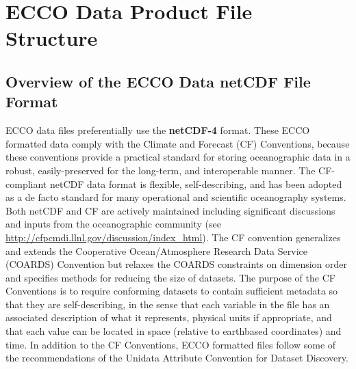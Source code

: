 



\pagebreak

\section{ECCO Data Product File Structure}
\subsection{Overview of the ECCO Data netCDF File Format}

ECCO data files preferentially use the \textbf{netCDF-4} format. These ECCO formatted data comply with the Climate and Forecast (CF) Conventions, because these conventions provide a practical standard for storing oceanographic data in a robust, easily-preserved for the long-term, and interoperable manner. The CF-compliant netCDF data format is flexible, self-describing, and has been adopted as a de facto standard for many operational and scientific oceanography systems. Both netCDF and CF are actively maintained
including significant discussions and inputs from the oceanographic community (see \url{http://cfpcmdi.llnl.gov/discussion/index_html}). 
The CF convention generalizes and extends the Cooperative Ocean/Atmosphere Research Data Service (COARDS) Convention but relaxes the COARDS constraints on dimension order and specifies methods for reducing the size of datasets. The purpose
of the CF Conventions is to require conforming datasets to contain sufficient metadata so that they are
self-describing, in the sense that each variable in the file has an associated description of what it
represents, physical units if appropriate, and that each value can be located in space (relative to earthbased coordinates) and time. In addition to the CF Conventions, ECCO formatted files follow some of the recommendations of the Unidata Attribute Convention for Dataset Discovery. \par \vspace{0.1in}

